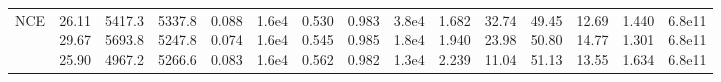 \begin{landscape}
\begin{table}[t]
{\begin{tabular}{@{}lrrrrrrrrrrrrrr@{}}
NCE & \makecell[r]{26.11\\29.67\\25.90} & \makecell[r]{5417.3\\5693.8\\4967.2} & \makecell[r]{5337.8\\5247.8\\5266.6} & \makecell[r]{0.088\\0.074\\0.083} & \makecell[r]{1.6e4\\1.6e4\\1.6e4} & \makecell[r]{0.530\\0.545\\0.562} & \makecell[r]{0.983\\0.985\\0.982} & \makecell[r]{3.8e4\\1.8e4\\1.3e4} & \makecell[r]{1.682\\1.940\\2.239} & \makecell[r]{32.74\\23.98\\11.04} & \makecell[r]{49.45\\50.80\\51.13} & \makecell[r]{12.69\\14.77\\13.55} & \makecell[r]{1.440\\1.301\\1.634} & \makecell[r]{6.8e11\\6.8e11\\6.8e11} \\

\end{tabular}}
\end{table}
\end{landscape}
